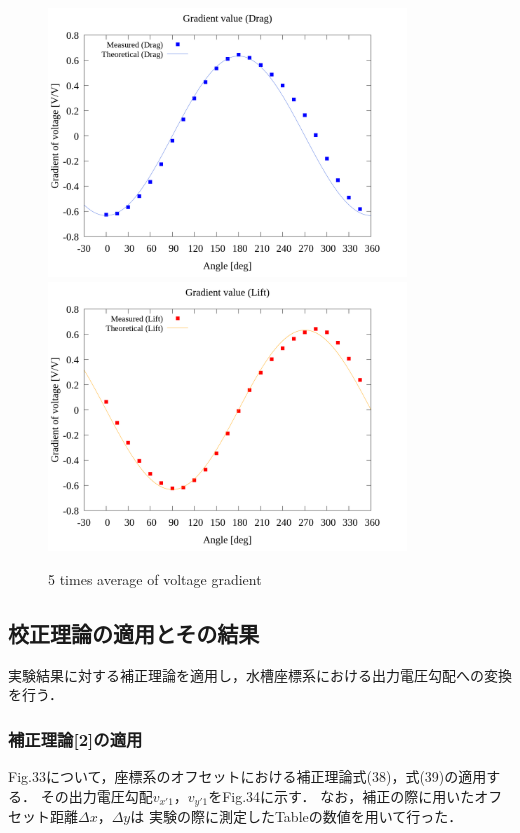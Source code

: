 \begin{figure}[htbp]
  \begin{center}
    \includegraphics[width=95mm]{../../02_workspace/result/2-ex/plot/21/21-1_summary_drag.png}
    \includegraphics[width=95mm]{../../02_workspace/result/2-ex/plot/21/21-1_summary_lift.png}
  \end{center}
  \caption{5 times average of voltage gradient}
\end{figure}

\newpage

\subsection{校正理論の適用とその結果}
実験結果に対する補正理論を適用し，水槽座標系における出力電圧勾配への変換を行う．

\subsubsection{補正理論[2]の適用}
Fig.33について，座標系のオフセットにおける補正理論式(38)，式(39)の適用する．
その出力電圧勾配$v_{x'1}$，$v_{y'1}$をFig.34に示す．
なお，補正の際に用いたオフセット距離$\Delta x$，$\Delta y$は
実験の際に測定したTableの数値を用いて行った．

